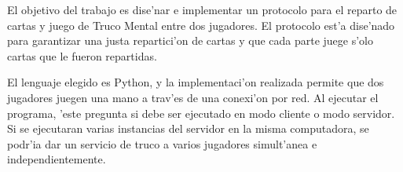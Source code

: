 El objetivo del trabajo es dise'nar e implementar un protocolo para el reparto de cartas y juego de Truco Mental entre dos jugadores.
El protocolo est'a dise'nado para garantizar una justa repartici'on de cartas y que cada parte juege s'olo cartas que le fueron repartidas.

El lenguaje elegido es Python, y la implementaci'on realizada permite que dos jugadores juegen una mano a trav'es de una conexi'on por red. Al ejecutar el programa, 'este pregunta si debe ser ejecutado en modo cliente o modo servidor. Si se ejecutaran varias instancias del servidor en la misma computadora, se podr'ia dar un servicio de truco a varios jugadores simult'anea e independientemente.